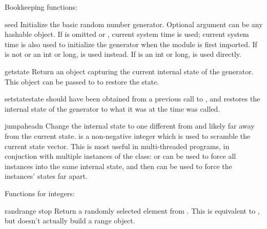 Bookkeeping functions:

\begin{funcdesc}{seed}{}
  Initialize the basic random number generator.
  Optional argument  can be any hashable object.
  If  is omitted or , current system time is used;
  current system time is also used to initialize the generator when the
  module is first imported.
  If  is not  or an int or long,
   is used instead.
  If  is an int or long,  is used directly.
\end{funcdesc}

\begin{funcdesc}{getstate}{}
  Return an object capturing the current internal state of the
  generator.  This object can be passed to  to
  restore the state.
\end{funcdesc}

\begin{funcdesc}{setstate}{state}
   should have been obtained from a previous call to
  , and  restores the
  internal state of the generator to what it was at the time
   was called.
\end{funcdesc}

\begin{funcdesc}{jumpahead}{n}
  Change the internal state to one different from and likely far away from
  the current state.   is a non-negative integer which is used to
  scramble the current state vector.  This is most useful in multi-threaded
  programs, in conjuction with multiple instances of the 
  class:  or  can be used to force all
  instances into the same internal state, and then 
  can be used to force the instances' states far apart.
 \end{funcdesc}


Functions for integers:

\begin{funcdesc}{randrange}{ stop}
  Return a randomly selected element from .  This is equivalent to
  ,
  but doesn't actually build a range object.
\end{funcdesc}


